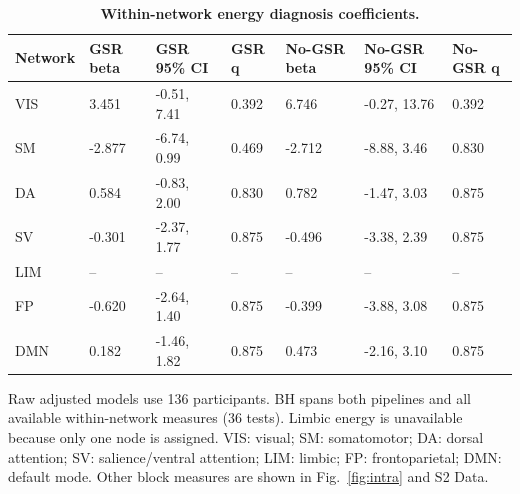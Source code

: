 \begin{table}[H]
\centering\small
\caption{\textbf{Within-network energy diagnosis coefficients.}}\label{tab:intra}
\begin{tabular}{lllllll}
\toprule
Network & GSR beta & GSR 95\% CI & GSR q & No-GSR beta & No-GSR 95\% CI & No-GSR q \\
\midrule
VIS & 3.451 & -0.51, 7.41 & 0.392 & 6.746 & -0.27, 13.76 & 0.392 \\
SM & -2.877 & -6.74, 0.99 & 0.469 & -2.712 & -8.88, 3.46 & 0.830 \\
DA & 0.584 & -0.83, 2.00 & 0.830 & 0.782 & -1.47, 3.03 & 0.875 \\
SV & -0.301 & -2.37, 1.77 & 0.875 & -0.496 & -3.38, 2.39 & 0.875 \\
LIM & -- & -- & -- & -- & -- & -- \\
FP & -0.620 & -2.64, 1.40 & 0.875 & -0.399 & -3.88, 3.08 & 0.875 \\
DMN & 0.182 & -1.46, 1.82 & 0.875 & 0.473 & -2.16, 3.10 & 0.875 \\
\bottomrule
\end{tabular}
\begin{flushleft}\footnotesize
Raw adjusted models use 136 participants. BH spans both pipelines and all available within-network measures (36 tests). Limbic energy is unavailable because only one node is assigned. VIS: visual; SM: somatomotor; DA: dorsal attention; SV: salience/ventral attention; LIM: limbic; FP: frontoparietal; DMN: default mode. Other block measures are shown in Fig.~\ref{fig:intra} and S2 Data.
\end{flushleft}
\end{table}

